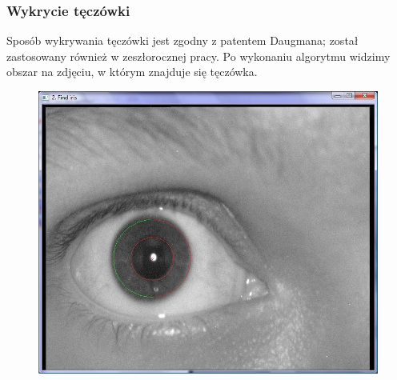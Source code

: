 \documentclass{beamer}
\begin{document}



\begin{frame}
\frametitle{Wykrycie tęczówki}
Sposób wykrywania tęczówki jest zgodny z patentem Daugmana; został zastosowany również w zeszłorocznej pracy. Po wykonaniu algorytmu widzimy obszar na zdjęciu, w którym znajduje się tęczówka.
\begin{figure}
\begin{center}
\includegraphics[scale=0.25]{teczowka_nasza.jpg}
\end{center}
\end{figure}
\end{frame}

\end{document}

